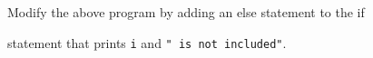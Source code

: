 Modify the above program by adding an else statement to the if

statement that prints \texttt{i} and \texttt{" is not included"}.


